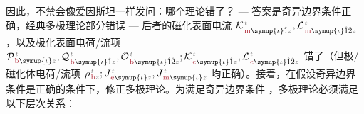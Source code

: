 因此，不禁会像爱因斯坦一样发问：哪个理论错了？ ---  答案是奇异边界条件正确，经典多极理论部分错误  ---  后者的磁化表面电流 ${\mathcal{K}}^{\;\!\mathcolor{gray}{t}}_{\;\!\textcolor{Maroon}{\text{m}} \symup{\iota}\hat{1} \mathcolor{gray}{z}},{\mathcal{L}}^{\;\!\mathcolor{gray}{t}}_{\;\!\textcolor{Maroon}{\text{m}} \symup{\iota}\hat{1}\hat{2} \mathcolor{gray}{z}}$，以及极化表面电荷/流项 ${\mathcal{P}}^{\;\!\mathcolor{gray}{t}}_{\;\!\textcolor{Maroon}{\text{b}} \symup{\iota} \mathcolor{gray}{z}},{\mathcal{Q}}^{\;\!\mathcolor{gray}{t}}_{\;\!\textcolor{Maroon}{\text{b}} \symup{\iota}\hat{1} \mathcolor{gray}{z}},{\mathcal{O}}^{\;\!\mathcolor{gray}{t}}_{\;\!\textcolor{Maroon}{\text{b}} \symup{\iota}\hat{1}\hat{2} \mathcolor{gray}{z}};{\mathcal{K}}^{\;\!\mathcolor{gray}{t}}_{\;\!\textcolor{Maroon}{\text{e}} \symup{\iota}\hat{1} \mathcolor{gray}{z}},{\mathcal{L}}^{\;\!\mathcolor{gray}{t}}_{\;\!\textcolor{Maroon}{\text{e}} \symup{\iota}\hat{1}\hat{2} \mathcolor{gray}{z}}$ 错了（但极/磁化体电荷/流项 ${\rho}^{\;\!\mathcolor{gray}{t}}_{\;\!\textcolor{Maroon}{\text{b}} \mathcolor{gray}{z}};{J}^{\;\!\mathcolor{gray}{t}}_{\;\!\textcolor{Maroon}{\text{e}} \symup{\iota} \mathcolor{gray}{z}},{J}^{\;\!\mathcolor{gray}{t}}_{\;\!\textcolor{Maroon}{\text{m}} \symup{\iota} \mathcolor{gray}{z}}$ 均正确）。接着，在假设奇异边界条件是正确的条件下，修正多极理论。为满足奇异边界条件 ，多极理论必须满足以下层次关系：
